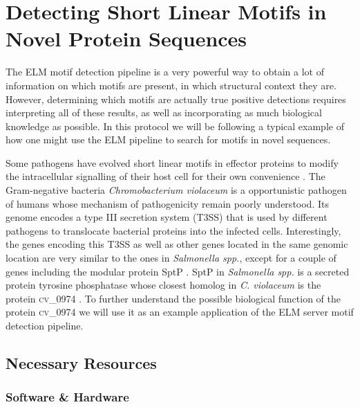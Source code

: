 \documentclass[12pt]{article}
\newcounter{proto}
\newcommand\uniprot[1]{%
	\textsc{\lowercase{#1}}%
}
\begin{document}
	\clearpage

	\section{Detecting Short Linear Motifs in Novel Protein Sequences}
	\label{sec:predicting_cv_0974}


	The ELM motif detection pipeline is a very powerful way to obtain a lot of
	information on which motifs are present, in which structural context they
	are. However, determining which motifs are actually true positive detections
	requires interpreting all of these results, as well as incorporating as much
	biological knowledge as possible. In this protocol we will be following a
	typical example of how one might use the ELM pipeline to search for
	motifs in novel sequences.

	Some pathogens have evolved short linear motifs in effector proteins to modify
	the intracellular signalling of their host cell for their own convenience
	\citep{25475989}. The Gram-negative bacteria \textit{Chromobacterium violaceum} is a
	opportunistic pathogen of humans whose mechanism of pathogenicity remain poorly
	understood. Its genome encodes a type III secretion system (T3SS) that is
	used by different pathogens to translocate bacterial proteins into the infected cells.
	Interestingly, the genes encoding this T3SS as well as other genes located in
	the same genomic location are very similar to the ones in \textit{Salmonella spp.},
	except for a couple of genes including the modular protein SptP
	\citep{15100995}. SptP in \textit{Salmonella spp.} is a secreted protein tyrosine
	phosphatase \citep{8866485} whose closest homolog in \textit{C. violaceum} is
	the protein \uniprot{CV\_0974}. To further understand the possible biological
	function of the protein \uniprot{CV\_0974} we will use it as an example
	application of the ELM server motif detection pipeline.

	\subsection*{Necessary Resources}
	\subsubsection*{Software \& Hardware}
	
\end{document}
